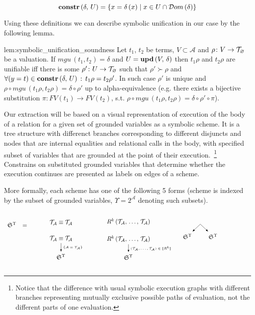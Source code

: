 \[ \mbox{\textbf{constr}}\,(\delta,\, U) = \{ x = \delta\,(x) \mid x \in U \cap \mathcal{D}om\,(\delta) \} \]

Using these definitions we can describe symbolic unification in our case by the following lemma.

\begin{replemma}{lem:symbolic_unification_soundness}
Let $t_1$, $t_2$ be terms,  $V \subset \mathcal{A}$ and $\rho \colon V \to \mathcal{T}_{\varnothing}$ be a valuation. If $mgu\,(t_1, t_2) = \delta$ and $U = \mbox{\textbf{upd}}\,(V,\, \delta) $  then $t_1 \rho$ and $t_2 \rho$ are unifiable iff there is some $\rho' \colon U \to \mathcal{T}_{\varnothing}$ such that $\rho' \succ \rho$ and $\forall (y = t) \in \mbox{\textbf{constr}}\,(\delta,\, U)\,:\, t_1 \rho = t_2 \rho'$.
In such case $\rho'$ is unique and $ \rho \circ mgu\,(t_1 \rho, t_2 \rho) = \delta\circ\rho' $ up to alpha-equivalence (e.g. there exists a bijective substitution $\pi : FV(t_1) \to FV(t_2)$, s.t. $ \rho \circ mgu\,(t_1 \rho, t_2 \rho) = \delta \circ\rho'\circ \pi$).
\end{replemma}

Our extraction will be based on a visual representation of execution of the body of a relation for a given set of grounded variables as a symbolic scheme. It is a tree structure with differenct branches corresponding to different disjuncts and nodes that are internal equalities and relational calls in the body, with specified subset of variables that are grounded at the point of their execution.~\footnote{Notice that the difference with usual symbolic execution graphs with different branches representing mutually exclusive possible paths of evaluation, not the different parts of one evaluation.} Constrains on substituted grounded variables that determine whether the execution continues are presented as labels on edges of a scheme.

More formally, each scheme has one of the following 5 forms (scheme is indexed by the subset of grounded variables, $\Upsilon = 2^{\mathcal{A}}$ denoting such subsets).

\[
\renewcommand{\arraystretch}{3}
\begin{array}{ccm{0.5cm}m{3cm}m{4cm}m{4cm}}
  \schemewithvset{\mathfrak{S}}{\Upsilon} & = && \schemenode{$\unigoal{\mathcal{T}_\mathcal{A}}{\mathcal{T}_\mathcal{A}}$} & \schemenode{$\invokegoal{R^k}{\mathcal{T}_\mathcal{A}}{\mathcal{T}_\mathcal{A}}$} 
                                       & \multirow{2}{*}{\schemefork{$\schemewithvset{\mathfrak{S}}{\Upsilon}$}{$\schemewithvset{\mathfrak{S}}{\Upsilon}$}} \\
                                   &   && \schemesarrow{$\unigoal{\mathcal{T}_\mathcal{A}}{\mathcal{T}_\mathcal{A}}$}{$\{\mathcal{A}=\mathcal{T}_\mathcal{A}\}$}{$\schemewithvset{\mathfrak{S}}{\Upsilon}$}
                                       & \schemedarrow{$\invokegoal{R^k}{\mathcal{T}_\mathcal{A}}{\mathcal{T}_\mathcal{A}}$}{$(\mathcal{T}_\mathcal{A}, \dots, \mathcal{T}_\mathcal{A}) \in \sembr{R^k}$}{$\schemewithvset{\mathfrak{S}}{\Upsilon}$}
                                       & 
\end{array}
\]

